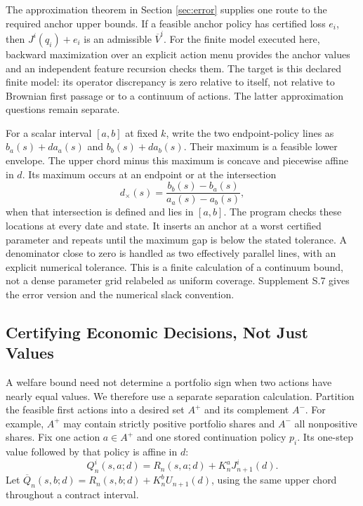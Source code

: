 The approximation theorem in Section \ref{sec:error} supplies one route to the required anchor upper bounds. If a feasible anchor policy has certified loss $e_i$, then $J^i(q_i)+e_i$ is an admissible $\overline V^i$. For the finite model executed here, backward maximization over an explicit action menu provides the anchor values and an independent feature recursion checks them. The target is this declared finite model: its operator discrepancy is zero relative to itself, not relative to Brownian first passage or to a continuum of actions. The latter approximation questions remain separate.

For a scalar interval $[a,b]$ at fixed $k$, write the two endpoint-policy lines as $b_a(s)+d a_a(s)$ and $b_b(s)+d a_b(s)$. Their maximum is a feasible lower envelope. The upper chord minus this maximum is concave and piecewise affine in $d$. Its maximum occurs at an endpoint or at the intersection
\begin{equation}
 d_\times(s)=\frac{b_b(s)-b_a(s)}{a_a(s)-a_b(s)},
 \label{eq:intersection}
\end{equation}
when that intersection is defined and lies in $[a,b]$. The program checks these locations at every date and state. It inserts an anchor at a worst certified parameter and repeats until the maximum gap is below the stated tolerance. A denominator close to zero is handled as two effectively parallel lines, with an explicit numerical tolerance. This is a finite calculation of a continuum bound, not a dense parameter grid relabeled as uniform coverage. Supplement S.7 gives the error version and the numerical slack convention.

\subsection{Certifying Economic Decisions, Not Just Values}
A welfare bound need not determine a portfolio sign when two actions have nearly equal values. We therefore use a separate separation calculation. Partition the feasible first actions into a desired set $A^+$ and its complement $A^-$. For example, $A^+$ may contain strictly positive portfolio shares and $A^-$ all nonpositive shares. Fix one action $a\in A^+$ and one stored continuation policy $p_i$. Its one-step value followed by that policy is affine in $d$:
\begin{equation}
 Q^i_n(s,a;d)=R_n(s,a;d)+K_n^aJ^i_{n+1}(d).
 \label{eq:tail_value}
\end{equation}
Let $\overline Q_n(s,b;d)=R_n(s,b;d)+K_n^bU_{n+1}(d)$, using the same upper chord throughout a contract interval.

